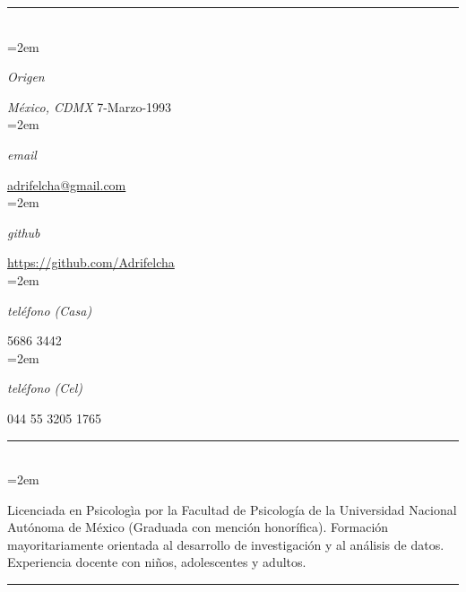 \documentclass{scrartcl}
\newlength{\datebox}\settowidth{\datebox}{September 2017} %
\newcommand{\NewEntry}[3]{\noindent\hangindent=2em\hangafter=0 \parbox{\datebox}{\small \textit{#1}}\hspace{1.5em} #2 #3 %
\vspace{0.5em}} %
\newcommand{\Description}[1]{\hangindent=2em\hangafter=0\noindent\raggedright\footnotesize{#1}\par\normalsize\vspace{1em}} %
\begin{document}
\thispagestyle{empty} %


\begin{cv}{\textbf{}}\vspace{1.5em} %

\hrule{}\vspace{1.5em}

\noindent{}\vspace{0.1em}\\ %

\NewEntry{Origen}{\textit{México, CDMX}}{7-Marzo-1993}\\ %
\NewEntry{email}{\href{mailto:adrifelcha@gmail.com}{adrifelcha@gmail.com}}\\ %
\NewEntry{github}{\href{https://github.com/Adrifelcha}{https://github.com/Adrifelcha}}\\ %
\NewEntry{teléfono (Casa)}{5686 3442}\\ %
\NewEntry{teléfono (Cel)}{044 55 3205 1765}\\%

\hrule{}\vspace{1.5em}

\noindent{}\vspace{0.1em}\\ %

\Description{Licenciada en Psicologìa por la Facultad de Psicología de la Universidad Nacional Autónoma de México (Graduada con mención honorífica). Formación mayoritariamente orientada al desarrollo de investigación y al análisis de datos. Experiencia docente con niños, adolescentes y adultos.}\vspace{1em} %

\hrule{}\vspace{1.5em}


\end{cv}
\end{document}
